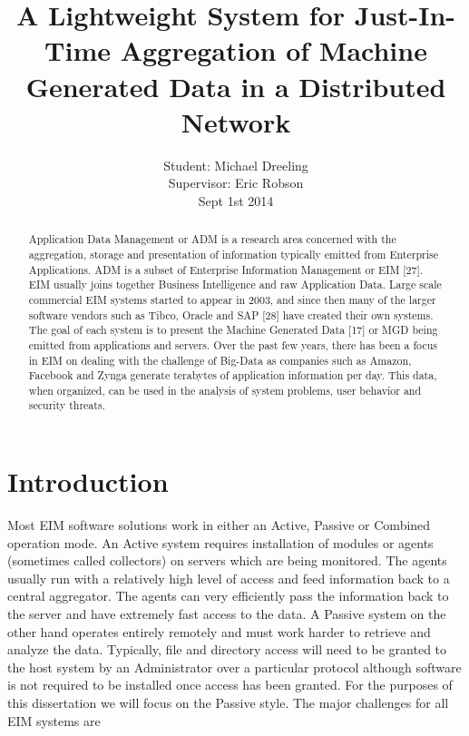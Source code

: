 \documentclass{llncs}
\begin{document}
%
\newpage

%
\title{A Lightweight System for Just-In-Time Aggregation of Machine Generated Data in a Distributed Network}

\author {Student: Michael Dreeling\\{ Supervisor: Eric Robson}\\{ Sept 1st 2014}}

\maketitle
%
\begin{abstract}
Application Data Management or ADM is a research area concerned with the aggregation, storage and presentation of information typically emitted from Enterprise Applications. ADM is a subset of Enterprise Information Management or EIM [27]. EIM usually joins together Business Intelligence and raw Application Data. Large scale commercial EIM systems started to appear in 2003, and since then many of the larger software vendors such as Tibco, Oracle and SAP [28] have created their own systems. The goal of each system is to present the Machine Generated Data [17] or MGD being emitted from applications and servers. Over the past few years, there has been a focus in EIM on dealing with the challenge of Big-Data as companies such as Amazon, Facebook and Zynga generate terabytes of application information per day. This data, when organized, can be used in the analysis of system problems, user behavior and security threats.
\end{abstract}
%
\section{Introduction}
%
Most EIM software solutions work in either an Active, Passive or Combined operation mode. An Active system requires installation of modules or agents (sometimes called collectors) on servers which are being monitored. The agents usually run with a relatively high level of access and feed information back to a central aggregator. The agents can very efficiently pass the information back to the server and have extremely fast access to the data. A Passive system on the other hand operates entirely remotely and must work harder to retrieve and analyze the data. Typically, file and directory access will need to be granted to the host system by an Administrator over a particular protocol although software is not required to be installed once access has been granted. For the purposes of this dissertation we will focus on the Passive style. The major challenges for all EIM systems are 
\end{document}
